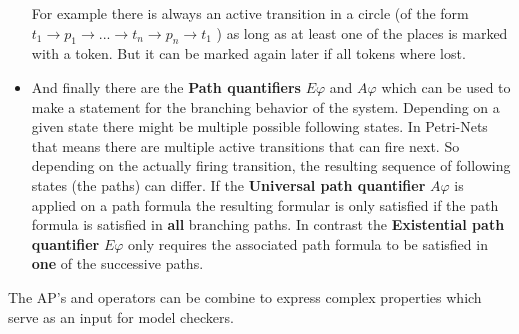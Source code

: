 \begin{itemize}
  For example there is always an active transition in a circle (of the form $t_1\rightarrow p_1 \rightarrow ... \rightarrow t_n \rightarrow p_n \rightarrow t_1$ ) as long as at least one of the places is marked with a token.
  But it can be marked again later if all tokens where lost.
  \item And finally there are the \textbf{Path quantifiers} $E\varphi$ and $A\varphi$ which can be used to make a statement for the branching behavior of the system.
  Depending on a given state there might be multiple possible following states.
  In Petri-Nets that means there are multiple active transitions that can fire next.
  So depending on the actually firing transition, the resulting sequence of following states (the paths) can differ.
  If the \textbf{Universal path quantifier} $A\varphi$ is applied on a path formula the resulting formular is only satisfied if the path formula is satisfied in \textbf{all} branching paths.
  In contrast the \textbf{Existential path quantifier} $E\varphi$ only requires the associated path formula to be satisfied in \textbf{one} of the successive paths.
\end{itemize}
The AP's and operators can be combine to express complex properties which serve as an input for model checkers.
